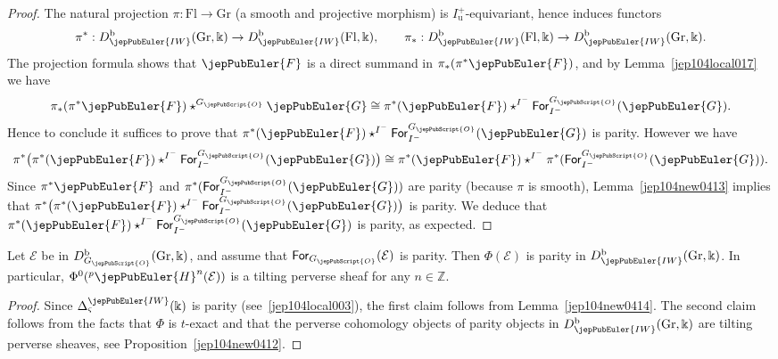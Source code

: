 \begin{proof}
The natural projection $\pi:\mathrm{Fl}\to\mathrm{Gr}$ (a smooth and projective morphism) is $I^+_{\mathrm u}$-equivariant, hence induces functors
\[
\pi^*:D^{\mathrm b}_{\jepPubEuler{IW}}(\mathrm{Gr},\Bbbk)\to D^{\mathrm b}_{\jepPubEuler{IW}}(\mathrm{Fl},\Bbbk),\qquad
\pi_*:D^{\mathrm b}_{\jepPubEuler{IW}}(\mathrm{Fl},\Bbbk)\to D^{\mathrm b}_{\jepPubEuler{IW}}(\mathrm{Gr},\Bbbk).
\]
The projection formula shows that $\jepPubEuler{F}$ is a direct summand in $\pi_*(\pi^*\jepPubEuler{F})$, and by Lemma~\ref{jep104local017} we have
\[
\pi_*(\pi^*\jepPubEuler{F})\star^{G_{\jepPubScript{O}}}\jepPubEuler{G}\cong\pi^*(\jepPubEuler{F})\star^{I^-}\mathsf{For}^{G_{\jepPubScript{O}}}_{I^-}(\jepPubEuler{G}).
\]
Hence to conclude it suffices to prove that $\pi^*(\jepPubEuler{F})\star^{I^-}\mathsf{For}^{G_{\jepPubScript{O}}}_{I^-}(\jepPubEuler{G})$ is parity. However we have
\[
\pi^*\bigl(\pi^*(\jepPubEuler{F})\star^{I^-}\mathsf{For}^{G_{\jepPubScript{O}}}_{I^-}(\jepPubEuler{G})\bigr)\cong\pi^*(\jepPubEuler{F})\star^{I^-}\pi^*(\mathsf{For}^{G_{\jepPubScript{O}}}_{I^-}(\jepPubEuler{G})).
\]
Since $\pi^*\jepPubEuler{F}$ and $\pi^*(\mathsf{For}^{G_{\jepPubScript{O}}}_{I^-}(\jepPubEuler{G}))$ are parity (because $\pi$ is smooth), Lemma~\ref{jep104new0413} implies that $\pi^*\bigl(\pi^*(\jepPubEuler{F})\star^{I^-}\mathsf{For}^{G_{\jepPubScript{O}}}_{I^-}(\jepPubEuler{G})\bigr)$ is parity.
We deduce that $\pi^*(\jepPubEuler{F})\star^{I^-}\mathsf{For}^{G_{\jepPubScript{O}}}_{I^-}(\jepPubEuler{G})$ is parity, as expected.
\end{proof}
\begin{cor}\label{jep104new0415}
Let $\mathcal E$ be in $D^{\mathrm b}_{G_{\jepPubScript{O}}}(\mathrm{Gr},\Bbbk)$, and assume that $\mathsf{For}_{G_{\jepPubScript{O}}}(\mathcal E)$ is parity.
Then $\Phi(\mathcal E)$ is parity in $D^{\mathrm b}_{\jepPubEuler{IW}}(\mathrm{Gr},\Bbbk)$.
In particular, $\Phi^0({}^{p}\jepPubEuler{H}^{n}(\mathcal E))$ is a tilting perverse sheaf for any $n\in\mathbb Z$.
\end{cor}
\begin{proof}
Since $\Delta^{\jepPubEuler{IW}}_{\varsigma}(\Bbbk)$ is parity (see~\eqref{jep104local003}), the first claim follows from Lemma~\ref{jep104new0414}.
The second claim follows from the facts that $\Phi$ is $t$-exact and that the perverse cohomology objects of parity objects in $D^{\mathrm b}_{\jepPubEuler{IW}}(\mathrm{Gr},\Bbbk)$ are tilting perverse sheaves, see Proposition~\ref{jep104new0412}.
\end{proof}
